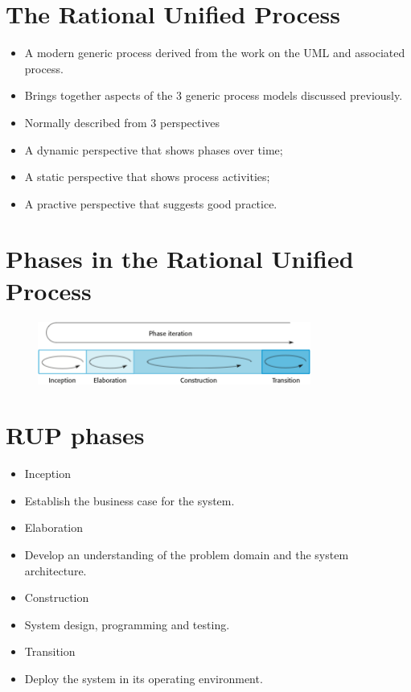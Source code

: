 \section{The Rational Unified Process}
\begin{itemize}
\item A modern generic process derived from the work on the UML and associated process.

\item Brings together aspects of the 3 generic process models discussed previously.

\item Normally described from 3 perspectives

\item A dynamic perspective that shows phases over time; \item A static perspective that shows process activities; \item A practive perspective that suggests good practice.
\end{itemize}

\newpage
\section{Phases in the Rational Unified Process}
\begin{figure}[h!]
    \centering
    \includegraphics[width = 0.8\textwidth]{./figures/L1_12.png}
    \caption{}
    \label{fig:L1_12}
\end{figure}


\section{RUP phases}
\begin{itemize}
\item Inception

\item Establish the business case for the system. \item Elaboration
\item Develop an understanding of the problem domain and the system architecture.

\item Construction

\item System design, programming and testing.
\item Transition
\item Deploy the system in its operating environment.
\end{itemize}

